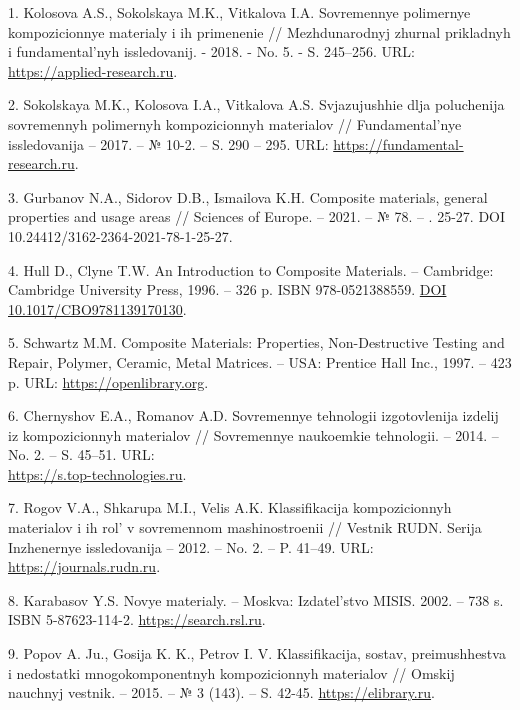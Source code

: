 \begin{references}
1.  Kolosova A.S., Sokolskaya M.K., Vitkalova I.A. Sovremennye
polimernye kompozicionnye materialy i ih primenenie // Mezhdunarodnyj
zhurnal prikladnyh i fundamental'nyh issledovanij. - 2018. - No. 5. -
S. 245–256. URL: \href{https://applied-research.ru/ru/article/view?id=12252&ysclid=m7kors1qru673331574}{https://applied-research.ru}.

2. Sokolskaya M.K., Kolosova I.A., Vitkalova A.S. Svjazujushhie dlja
poluchenija sovremennyh polimer\-nyh kompozicionnyh materialov //
Fundamental'nye issledovanija – 2017. – № 10-2. – S. 290 –
295. URL: \href{https://fundamental-research.ru/ru/article/view?id=41827&ysclid=m7kowxw7wd681574555}{https://fundamental-research.ru}.

3. Gurbanov N.A., Sidorov D.B., Ismailova K.H. Composite materials,
general properties and usage areas // Sciences of Europe. – 2021. – №
78. – . 25-27. DOI 10.24412/3162-2364-2021-78-1-25-27.

4. Hull D., Clyne T.W. An Introduction to Composite Materials. –
Cambridge: Cambridge University Press, 1996. – 326 p. ISBN
978-0521388559. \href{https://doi.org/10.1017/CBO9781139170130}{DOI 10.1017/CBO9781139170130}.

5. Schwartz M.M. Composite Materials: Properties, Non-Destructive
Testing and Repair, Polymer, Cera\-mic, Metal Matrices. – USA: Prentice
Hall Inc., 1997. – 423
p. URL: \href{https://openlibrary.org/books/OL990224M/Composite_materials}{https://openlibrary.org}.

6. Chernyshov E.A., Romanov A.D. Sovremennye tehnologii izgotovlenija
izdelij iz kompozicionnyh materialov // Sovremennye naukoemkie
tehnologii. – 2014. – No. 2. –
S. 45–51. URL: \\\href{https://s.top-technologies.ru/pdf/2014/2/33649.pdf}{https://s.top-technologies.ru}.

7. Rogov V.A., Shkarupa M.I., Velis A.K. Klassifikacija kompozicionnyh
materialov i ih rol' v sovremen\-nom mashinostroenii // Vestnik
RUDN. Serija Inzhenernye issledovanija – 2012. – No. 2. –
P. 41–49. URL: \href{https://journals.rudn.ru/engineering-researches/article/view/4839?ysclid=m6j2ggf0is563072114}{https://journals.rudn.ru}.

8. Karabasov Y.S. Novye materialy. – Moskva: Izdatel'stvo
MISIS. 2002. – 738 s. ISBN
5-87623-114-2. \href{https://search.rsl.ru/ru/record/01001838887?ysclid=m87kojnf2s394686147}{https://search.rsl.ru}.

9. Popov A. Ju., Gosija K. K., Petrov I. V. Klassifikacija, sostav,
preimushhestva i nedostatki mnogokomp\-onentnyh kompozicionnyh
materialov // Omskij nauchnyj vestnik. – 2015. – № 3 (143). –
S. 42-45. \href{https://elibrary.ru/vcntut?ysclid=m6j2mhco63336644284}{https://elibrary.ru}.


\end{references}
